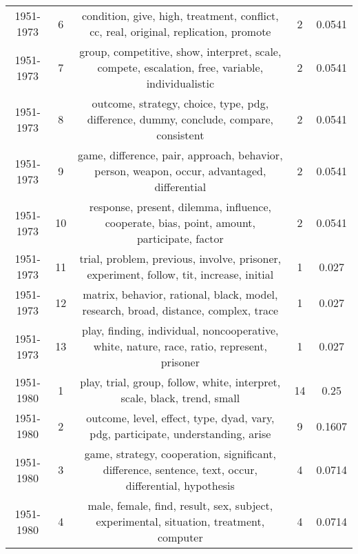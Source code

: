 \begin{tabular}{ccccc}
 1951-1973 &               6 &                          condition, give, high, treatment, conflict, cc, real, original, replication, promote &                2 &                  0.0541 \\
 1951-1973 &               7 &              group, competitive, show, interpret, scale, compete, escalation, free, variable, individualistic &                2 &                  0.0541 \\
 1951-1973 &               8 &                        outcome, strategy, choice, type, pdg, difference, dummy, conclude, compare, consistent &                2 &                  0.0541 \\
 1951-1973 &               9 &                   game, difference, pair, approach, behavior, person, weapon, occur, advantaged, differential &                2 &                  0.0541 \\
 1951-1973 &              10 &                    response, present, dilemma, influence, cooperate, bias, point, amount, participate, factor &                2 &                  0.0541 \\
 1951-1973 &              11 &                       trial, problem, previous, involve, prisoner, experiment, follow, tit, increase, initial &                1 &                   0.027 \\
 1951-1973 &              12 &                           matrix, behavior, rational, black, model, research, broad, distance, complex, trace &                1 &                   0.027 \\
 1951-1973 &              13 &                    play, finding, individual, noncooperative, white, nature, race, ratio, represent, prisoner &                1 &                   0.027 \\
 \midrule
 1951-1980 &               1 &                                      play, trial, group, follow, white, interpret, scale, black, trend, small &               14 &                    0.25 \\
 1951-1980 &               2 &                              outcome, level, effect, type, dyad, vary, pdg, participate, understanding, arise &                9 &                  0.1607 \\
 1951-1980 &               3 &         game, strategy, cooperation, significant, difference, sentence, text, occur, differential, hypothesis &                4 &                  0.0714 \\
 1951-1980 &               4 &                        male, female, find, result, sex, subject, experimental, situation, treatment, computer &                4 &                  0.0714 \\

\end{tabular}
